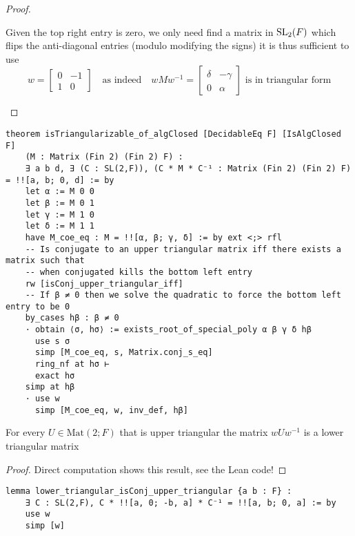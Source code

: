 \begin{proof}
\begin{itemize}
    Given the top right entry is zero, we only need find a matrix in $\operatorname{SL}_2(F)$ which flips the anti-diagonal entries (modulo modifying the signs)
    it is thus sufficient to use 
        \[
        w = \begin{bmatrix}
        0 & -1\\
        1 & 0
        \end{bmatrix} \quad \text{as indeed} \quad w M w^{-1} = \begin{bmatrix}
            \delta & -\gamma\\
            0 & \alpha
        \end{bmatrix} \text{ is in triangular form} 
        \]
\end{itemize}

\end{proof}
\begin{footnotesize}
\begin{verbatim}
theorem isTriangularizable_of_algClosed [DecidableEq F] [IsAlgClosed F]
    (M : Matrix (Fin 2) (Fin 2) F) :
    ∃ a b d, ∃ (C : SL(2,F)), (C * M * C⁻¹ : Matrix (Fin 2) (Fin 2) F) = !![a, b; 0, d] := by
    let α := M 0 0
    let β := M 0 1
    let γ := M 1 0
    let δ := M 1 1
    have M_coe_eq : M = !![α, β; γ, δ] := by ext <;> rfl
    -- Is conjugate to an upper triangular matrix iff there exists a matrix such that
    -- when conjugated kills the bottom left entry
    rw [isConj_upper_triangular_iff]
    -- If β ≠ 0 then we solve the quadratic to force the bottom left entry to be 0
    by_cases hβ : β ≠ 0
    · obtain ⟨σ, hσ⟩ := exists_root_of_special_poly α β γ δ hβ
      use s σ
      simp [M_coe_eq, s, Matrix.conj_s_eq]
      ring_nf at hσ ⊢
      exact hσ
    simp at hβ
    · use w
      simp [M_coe_eq, w, inv_def, hβ]
\end{verbatim}
\end{footnotesize}

\begin{corollary}
    \label{lower_triangular_isConj_upper_triangular}
    \leanok
    For every $U \in\textrm{Mat}(2; F)$ that is upper triangular the matrix $w U w^{-1}$ is a lower triangular matrix
\end{corollary}
\begin{proof}
    \leanok
    Direct computation shows this result, see the Lean code!
\end{proof}
\begin{footnotesize}
\begin{verbatim}
lemma lower_triangular_isConj_upper_triangular {a b : F} :
    ∃ C : SL(2,F), C * !![a, 0; -b, a] * C⁻¹ = !![a, b; 0, a] := by
    use w
    simp [w]
\end{verbatim}
\end{footnotesize}

